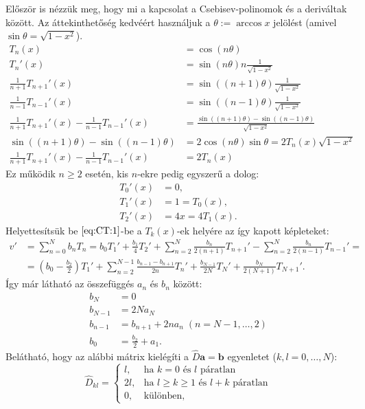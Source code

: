 \documentclass[oneside, titlepage, 12pt, a4paper]{report}
\begin{document}
Először is nézzük meg, hogy mi a kapcsolat a Csebisev-polinomok és a deriváltak között. Az áttekinthetőség kedvéért használjuk a $\theta := \arccos x$ jelölést (amivel $\sin \theta = \sqrt{1 - x^2}$).
\begin{align*}
T_n (x) &= \cos(n \theta) \\
T_n' (x) &= \sin(n \theta) n \frac{1}{\sqrt{1 - x^2}} \\
\frac{1}{n+1} T_{n+1}' (x) &= \sin((n+1) \theta) \frac{1}{\sqrt{1 - x^2}} \\
\frac{1}{n-1} T_{n-1}' (x) &= \sin((n-1) \theta) \frac{1}{\sqrt{1 - x^2}} \\
\frac{1}{n+1} T_{n+1}' (x) - \frac{1}{n-1} T_{n-1}' (x) &= \frac{\sin((n+1) \theta) - \sin((n-1) \theta)}{\sqrt{1 - x^2}} \\
\sin((n+1) \theta) - \sin((n-1) \theta) &= 2 \cos(n \theta) \sin\theta = 2 T_n(x) \sqrt{1 - x^2} \\
\frac{1}{n+1} T_{n+1}' (x) - \frac{1}{n-1} T_{n-1}' (x) &= 2 T_n(x)
\end{align*}
Ez működik $n \geq 2$ esetén, kis $n$-ekre pedig egyszerű a dolog:
\begin{align*}
T_0' (x) &= 0, \\
T_1' (x) &= 1 = T_0(x), \\
T_2' (x) &= 4x = 4 T_1(x).
\end{align*}
Helyettesítsük be $\eqref{eq:CT:1}$-be a $T_k(x)$-ek helyére az így kapott képleteket:
\begin{align*}
v' &= \sum_{n = 0}^N b_n T_n = b_0 T_1' + \frac{b_1}{4} T_2' + \sum_{n=2}^N \frac{b_n}{2(n+1)} T_{n+1}' - \sum_{n=2}^N \frac{b_n}{2(n-1)} T_{n-1}' = \\
 &= \left( b_0 - \frac{b_2}{2} \right) T_1' + \sum_{n=2}^{N - 1} \frac{b_{n-1} - b_{n+1}}{2n} T_n' + \frac{b_{N-1}}{2N} T_N' + \frac{b_N}{2(N+1)}T_{N+1}'.
\end{align*}
Így már látható az összefüggés $a_n$ és $b_n$ között:
\begin{align*}
b_N &= 0 \\
b_{N-1} &= 2N a_N \\
b_{n-1} &= b_{n+1} + 2n a_n \;(n = N-1, \dots, 2) \\
b_0 &= \frac{b_2}{2} + a_1.
\end{align*}
Belátható, hogy az alábbi mátrix kielégíti a $\hat{D} \mathbf{a} = \mathbf{b}$ egyenletet ($k, l = 0, \dots, N$):
\begin{equation*}
\hat{D}_{kl} =
	\begin{cases}
	l, &\text{ha } k = 0 \text{ és } l \text{ páratlan} \\
	2l, &\text{ha } l \geq k \geq 1 \text{ és } l+k \text{ páratlan} \\
	0, &\text{különben},
	\end{cases}
\end{equation*}
\end{document}
